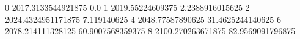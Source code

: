 0 2017.3133544921875 0.0
1 2019.55224609375 2.2388916015625
2 2024.4324951171875 7.119140625
4 2048.77587890625 31.4625244140625
6 2078.214111328125 60.9007568359375
8 2100.270263671875 82.9569091796875
